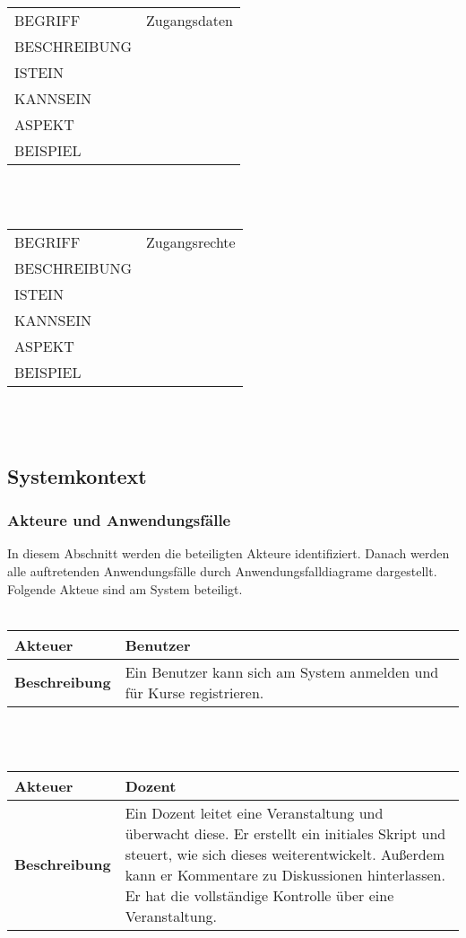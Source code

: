 \documentclass[12pt,a4paper]{article}
\begin{document}
\begin{tabular}{l p{10cm}}
BEGRIFF 	 & Zugangsdaten \\ 
BESCHREIBUNG & \\ 
ISTEIN   	 & \\
KANNSEIN 	 & \\ 
ASPEKT   	 & \\
BEISPIEL 	 & \\
\hline
\end{tabular}\\\\  

\begin{tabular}{l p{10cm}}
BEGRIFF 	 & Zugangsrechte \\ 
BESCHREIBUNG & \\ 
ISTEIN   	 & \\
KANNSEIN 	 & \\ 
ASPEKT   	 & \\
BEISPIEL 	 & \\
\hline
\end{tabular}\\\\ 


\subsection{Systemkontext}
\subsubsection{Akteure und Anwendungsfälle}
In diesem Abschnitt werden die beteiligten Akteure identifiziert. Danach werden alle auftretenden Anwendungsfälle durch Anwendungsfalldiagrame dargestellt.
Folgende Akteue sind am System beteiligt.\\\\

\begin{tabular}{l p{10cm}}
\textbf{Akteuer} & Benutzer \\ 
\hline \textbf{Beschreibung} & Ein Benutzer kann sich am System anmelden und für Kurse registrieren. \\ 
\hline 
\end{tabular}\\\\

\begin{tabular}{l p{10cm}}
\textbf{Akteuer} & Dozent \\ 
\hline \textbf{Beschreibung} & Ein Dozent leitet eine Veranstaltung und überwacht diese. Er erstellt ein initiales Skript und steuert, wie sich dieses weiterentwickelt. Außerdem kann er Kommentare zu Diskussionen hinterlassen. Er hat die vollständige Kontrolle über eine Veranstaltung.\\ 
\hline 
\end{tabular}\\\\
\end{document}
